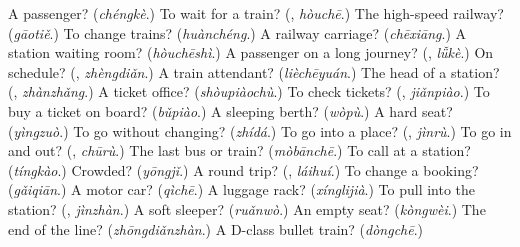 \begin{tcolorbox}[breakable,colback=teal!4,colframe=teal!35!black,title={Before you move on}]
A passenger? (\emph{chéngkè}.) To wait for a train? (\textbf{}, \emph{hòuchē}.) The high-speed railway? (\emph{gāotiě}.) To change trains? (\emph{huànchéng}.) A railway carriage? (\emph{chēxiāng}.) A station waiting room? (\emph{hòuchēshì}.) A passenger on a long journey? (\textbf{}, \emph{lǚkè}.) On schedule? (\textbf{}, \emph{zhèngdiǎn}.) A train attendant? (\emph{lièchēyuán}.) The head of a station? (\textbf{}, \emph{zhànzhǎng}.) A ticket office? (\emph{shòupiàochù}.) To check tickets? (\textbf{}, \emph{jiǎnpiào}.) To buy a ticket on board? (\emph{bǔpiào}.) A sleeping berth? (\emph{wòpù}.) A hard seat? (\emph{yìngzuò}.) To go without changing? (\emph{zhídá}.) To go into a place? (\textbf{}, \emph{jìnrù}.) To go in and out? (\textbf{}, \emph{chūrù}.) The last bus or train? (\emph{mòbānchē}.) To call at a station? (\emph{tíngkào}.) Crowded? (\emph{yōngjǐ}.) A round trip? (\textbf{}, \emph{láihuí}.) To change a booking? (\emph{gǎiqiān}.) A motor car? (\emph{qìchē}.) A luggage rack? (\emph{xínglijià}.) To pull into the station? (\textbf{}, \emph{jìnzhàn}.) A soft sleeper? (\emph{ruǎnwò}.) An empty seat? (\emph{kòngwèi}.) The end of the line? (\emph{zhōngdiǎnzhàn}.) A D-class bullet train? (\emph{dòngchē}.)
\end{tcolorbox}
